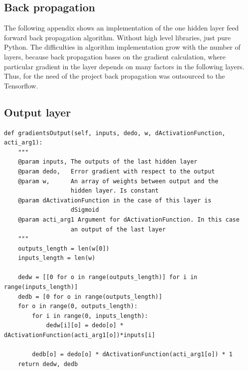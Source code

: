 \begin{appendices}

\begingroup
\renewcommand{\cleardoublepage}{}
\renewcommand{\clearpage}{}
\chapter{Back propagation} \label{ch:back}
\endgroup
The following appendix shows an implementation of the one hidden layer feed forward back propagation algorithm. Without high level libraries, just pure Python. The difficulties in algorithm implementation grow with the number of layers, because back propagation bases on the gradient calculation, where particular gradient in the layer depends on many factors in the following layers. Thus, for the need of the project back propagation was outsourced to the Tensorflow.
\section{Output layer}
\begin{verbatim}
def gradientsOutput(self, inputs, dedo, w, dActivationFunction, acti_arg1):
    """
    @param inputs, The outputs of the last hidden layer
    @param dedo,   Error gradient with respect to the output
    @param w,      An array of weights between output and the 
                   hidden layer. Is constant
    @param dActivationFunction in the case of this layer is 
                   dSigmoid 
    @param acti_arg1 Argument for dActivationFunction. In this case
                   an output of the last layer
    """
    outputs_length = len(w[0])
    inputs_length = len(w)

    dedw = [[0 for o in range(outputs_length)] for i in range(inputs_length)]
    dedb = [0 for o in range(outputs_length)]
    for o in range(0, outputs_length): 
        for i in range(0, inputs_length):
            dedw[i][o] = dedo[o] * dActivationFunction(acti_arg1[o])*inputs[i]
        
        dedb[o] = dedo[o] * dActivationFunction(acti_arg1[o]) * 1
    return dedw, dedb
\end{verbatim}

\end{appendices}
